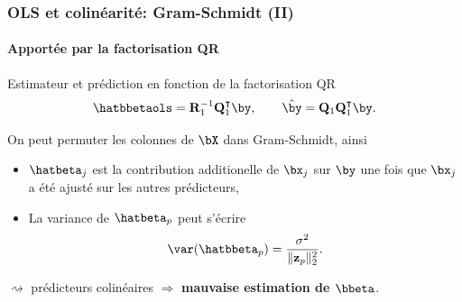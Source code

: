 \documentclass{beamer}\usepackage[]{graphicx}\usepackage[]{color}
\begin{document}
\begin{frame}
  \frametitle{OLS et colinéarité: Gram-Schmidt (II)}
  \framesubtitle{Apportée par la factorisation QR}

  \begin{block}{Estimateur   et   prédiction   en   fonction   de   la
      factorisation QR}
    \begin{equation*}
      \hatbbetaols = \mathbf{R}_1^{-1} \mathbf{Q}_1^\intercal \by,
\qquad      \hat{\by} = \mathbf{Q}_1 \mathbf{Q}_1^\intercal \by.
    \end{equation*}

  \end{block}

  On peut permuter les colonnes de $\bX$ dans Gram-Schmidt, ainsi

  \begin{itemize}
    \item $\hatbeta_j$ est la contribution additionelle de $\bx_j$
      sur $\by$ une fois que $\bx_j$ a été ajusté sur les autres prédicteurs,
    \item La variance de $\hatbeta_p$ peut s'écrire
      \begin{equation*}
        \var(\hatbbeta_p) = \frac{\sigma^2}{\|\mathbf{z}_p\|^2_2}.
      \end{equation*}
    \end{itemize}

    $\rightsquigarrow$ prédicteurs colinéaires $\Rightarrow$ \alert{\bf mauvaise estimation de $\bbeta$}.

\end{frame}
\end{document}
